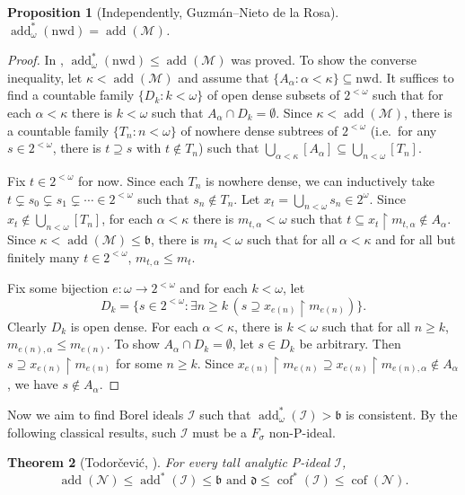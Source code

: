 \documentclass[a4paper,12pt]{amsart}
\newtheorem{thm}{Theorem}
\newtheorem{prop}[thm]{Proposition}
\theoremstyle{definition}
\numberwithin{thm}{section}
\numberwithin{equation}{section}
\newcommand{\bb}{\mathfrak{b}}
\newcommand{\dd}{\mathfrak{d}}
\DeclareMathOperator{\add}{add}
\DeclareMathOperator{\cof}{cof}
\newcommand{\addm}{\add(\mathcal{M})}
\newcommand{\I}{\mathscr{I}}
\newcommand{\nwd}{\mathrm{nwd}}
\renewcommand{\subset}{\subseteq}
\begin{document}
    \begin{prop}[Independently, Guzm\'an--Nieto de la Rosa]\label{prop:nwd_addm}
        $\add^*_\omega(\nwd) = \addm$.
    \end{prop}
    \begin{proof}
        In \cite[Theorem 4.9]{CM25}, $\add^*_\omega(\nwd) \leq \addm$ was proved. To show the converse inequality, let $\kappa<\addm$ and assume that $\{A_\alpha:\alpha<\kappa\}\subset\nwd$. It suffices to find a countable family $\{D_k:k<\omega\}$ of open dense subsets of $2^{<\omega}$ such that for each $\alpha<\kappa$ there is $k<\omega$ such that $A_\alpha \cap D_k=\emptyset$. Since $\kappa<\addm$, there is a countable family $\{T_n:n<\omega\}$ of nowhere dense subtrees of $2^{<\omega}$ (i.e.\ for any $s\in 2^{<\omega}$, there is $t\supseteq s$ with $t\notin T_n$) such that $\bigcup_{\alpha<\kappa}[A_\alpha]\subset\bigcup_{n<\omega}[T_n]$. 

        Fix $t\in 2^{<\omega}$ for now. Since each $T_n$ is nowhere dense, we can inductively take $t\subsetneq s_0\subsetneq s_1\subsetneq\cdots\in 2^{<\omega}$ such that $s_n\notin T_n$. Let $x_t = \bigcup_{n<\omega}s_n\in2^\omega$. Since $x_t\notin  \bigcup_{n<\omega}[T_n]$, for each $\alpha<\kappa$ there is $m_{t,\alpha}<\omega$ such that $t\subset x_t\upharpoonright m_{t,\alpha}\notin A_\alpha$. Since $\kappa<\addm\leq\bb$, there is $m_t<\omega$ such that for all $\alpha<\kappa$ and for all but finitely many $t\in 2^{<\omega}$, $m_{t,\alpha}\leq m_t$.
        
        Fix some bijection $e\colon\omega\to 2^{<\omega}$ and for each $k<\omega$, let
        \[
        D_k = \{s\in 2^{<\omega}: \exists n\geq k\,(s\supseteq x_{e(n)}\upharpoonright m_{e(n)})\}.
        \]
        Clearly $D_k$ is open dense. For each $\alpha<\kappa$, there is $k<\omega$ such that for all $n\geq k$, $m_{e(n),\alpha}\leq m_{e(n)}$. To show $A_\alpha\cap D_k=\emptyset$, let $s \in D_k$ be arbitrary. Then $s\supseteq x_{e(n)}\upharpoonright m_{e(n)}$ for some $n\geq k$. Since $x_{e(n)}\upharpoonright m_{e(n)}\supseteq x_{e(n)}\upharpoonright m_{e(n),\alpha}\notin A_\alpha$, we have $s\notin A_\alpha$.
    \end{proof}

    Now we aim to find Borel ideals $\I$ such that $\add^*_\omega(\I) > \bb$ is consistent. By the following classical results, such $\I$ must be a $F_\sigma$ non-P-ideal.

    \begin{thm}[Todor\v{c}evi\'{c}, \cite{Tod96}]\label{thm:Todorcevic}
        For every tall analytic P-ideal $\I$,
        \[
        \add(\mathcal{N}) \leq \add^*(\I) \leq \bb\text{ and }\dd\leq\cof^*(\I) \leq \cof(\mathcal{N}).
        \]
    \end{thm}
\end{document}
